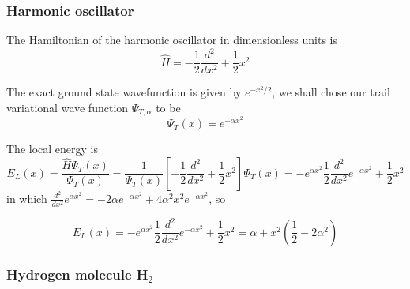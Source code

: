\documentclass{article}
\begin{document}
\subsubsection{Harmonic oscillator}
The Hamiltonian of the harmonic oscillator in dimensionless units is
\begin{equation}
 \hat{H}=-\frac12 \frac{d^2}{dx^2}+\frac12 x^2
\end{equation}

The exact ground state wavefunction is given by $e^{-x^2/2}$, we shall chose our trail variational wave function $\Psi_{T,\alpha}$ to be
\begin{equation}
 \Psi_{T}(x)=e^{-\alpha x^2}
\end{equation}

The local energy is \begin{equation}
 E_L(x)=\frac{\hat{H}\Psi_T(x)}{\Psi_T(x)}=\frac{1}{\Psi_T(x)} \left[ -\frac12 \frac{d^2}{dx^2}+\frac12 x^2 \right] \Psi_T(x)= -e^{\alpha x^2}\frac12 \frac{d^2}{dx^2}e^{-\alpha x^2}+\frac12 x^2
\end{equation}
in which $\frac{d^2}{dx^2}e^{\alpha x^2}=-2\alpha e^{-\alpha x^2}+4\alpha^2x^2e^{-\alpha x^2}$, so

\begin{equation}
 E_L(x)= -e^{\alpha x^2}\frac12 \frac{d^2}{dx^2}e^{-\alpha x^2}+\frac12 x^2=\alpha+ x^2 \left(\frac12 - 2\alpha^2 \right)
\end{equation}

\subsubsection{Hydrogen molecule H$_2$}
\end{document}
